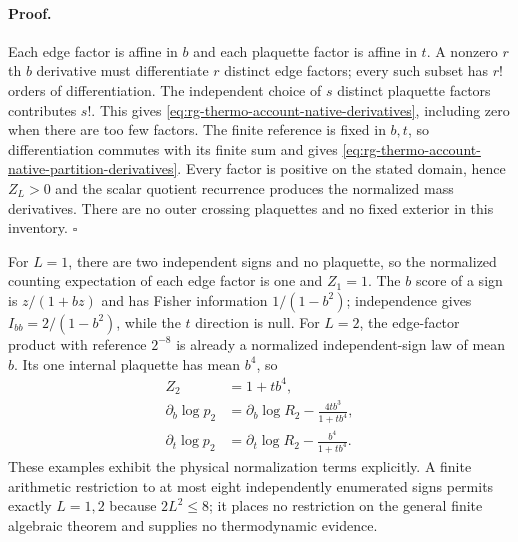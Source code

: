 \paragraph{Proof.}
Each edge factor is affine in $b$ and each plaquette factor is affine in
$t$. A nonzero $r$th $b$ derivative must differentiate $r$ distinct edge
factors; every such subset has $r!$ orders of differentiation. The
independent choice of $s$ distinct plaquette factors contributes $s!$.
This gives \cref{eq:rg-thermo-account-native-derivatives}, including
zero when there are too few factors. The finite reference is fixed in
$b,t$, so differentiation commutes with its finite sum and gives
\cref{eq:rg-thermo-account-native-partition-derivatives}. Every factor
is positive on the stated domain, hence $Z_L>0$ and the scalar quotient
recurrence produces the normalized mass derivatives. There are no outer
crossing plaquettes and no fixed exterior in this inventory. $\square$

For $L=1$, there are two independent signs and no plaquette, so the
normalized counting expectation of each edge factor is one and $Z_1=1$.
The $b$ score of a sign is $z/(1+bz)$ and has Fisher information
$1/(1-b^2)$; independence gives $I_{bb}=2/(1-b^2)$, while the
$t$ direction is null. For $L=2$, the edge-factor product with reference
$2^{-8}$ is already a normalized independent-sign law of mean $b$.
Its one internal plaquette has mean $b^4$, so
\begin{equation}
 \begin{aligned}
 Z_2&=1+tb^4,\\
 \partial_b\log p_2&=\partial_b\log R_2-
                  \frac{4tb^3}{1+tb^4},\\
 \partial_t\log p_2&=\partial_t\log R_2-
                  \frac{b^4}{1+tb^4}.
 \end{aligned}
 \label{eq:rg-thermo-account-small-native-partition}
\end{equation}
These examples exhibit the physical normalization terms explicitly. A
finite arithmetic restriction to at most eight independently enumerated
signs permits exactly $L=1,2$ because $2L^2\leq8$; it places no
restriction on the general finite algebraic theorem and supplies no
thermodynamic evidence.


